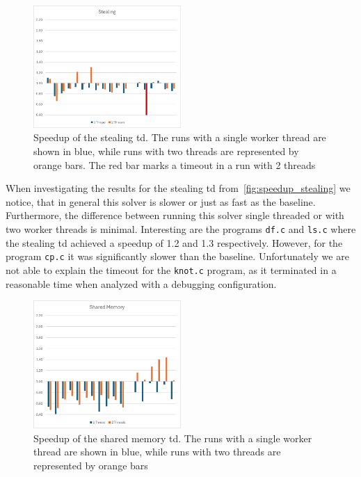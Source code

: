   \begin{figure}
    \includegraphics[width=0.5\textwidth]{../resources/Stealing_draft.png}
    \caption[Speedup of the stealing \ac{td}]{Speedup of the stealing \ac{td}. The runs with a single worker thread are shown in blue, while runs with two threads are represented by orange bars. The red bar marks a timeout in a run with 2 threads}
    \label{fig:speedup_stealing}
  \end{figure}

  When investigating the results for the stealing \ac{td} from~\autoref{fig:speedup_stealing} we notice, that in general this solver is slower or just as fast as the baseline. Furthermore, the difference between running this solver single threaded or with two worker threads is minimal. Interesting are the programs \texttt{df.c} and \texttt{ls.c} where the stealing \ac{td} achieved a speedup of 1.2 and 1.3 respectively. However, for the program \texttt{cp.c} it was significantly slower than the baseline. Unfortunately we are not able to explain the timeout for the \texttt{knot.c} program, as it terminated in a reasonable time when analyzed with a debugging configuration.

  \begin{figure}
    \includegraphics[width=0.5\textwidth]{../resources/SharedMem_draft.png}
    \caption[Speedup of the shared memory \ac{td}]{Speedup of the shared memory \ac{td}. The runs with a single worker thread are shown in blue, while runs with two threads are represented by orange bars}
    \label{fig:speedup_shared_mem}
  \end{figure}

